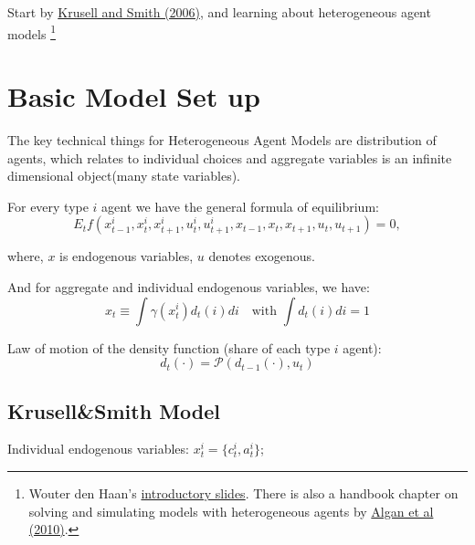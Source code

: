 
% 



Start by \href{http://www.econ.yale.edu/smith/paper15.pdf}{Krusell and Smith (2006)}, and learning about heterogeneous agent models \footnote{ Wouter den Haan's \href{http://www.wouterdenhaan.com/numerical/introhetero.pdf}{introductory slides}. There is also a handbook chapter on solving and simulating models with heterogeneous agents by \href{http://www.wouterdenhaan.com/numerical/handbookhetero.pdf}{Algan et al (2010)}.}


\section{Basic Model Set up}

The key technical things for Heterogeneous Agent Models are distribution of agents, which relates to individual choices and aggregate variables is an {\color{red} infinite dimensional object}(many state variables). 

For every type $i$ agent we have the general formula of equilibrium: 
\[ 
E_t f(x^i_{t-1}, x^i_{t}, x^i_{t+1},u^i_{t},u^i_{t+1},x_{t-1}, x_{t}, x_{t+1},u_{t},u_{t+1})=0, 
\]


where, $x$ is endogenous variables, $u$ denotes exogenous. 

And for aggregate and individual endogenous variables, we have: 
\[
x_t \equiv \int \gamma (x_t^i)d_t (i)di \quad \text{with } \int d_t (i)di = 1 
\]

Law of motion of the density function (share of each type $i$ agent): 
\[ d_t (\cdot) = \mathcal{P}(d_{t-1}(\cdot), u_t)\]

\subsection{Krusell\&Smith Model}

Individual endogenous variables: $x^i_t = \{c^i_t,a^i_t\}$;\\

